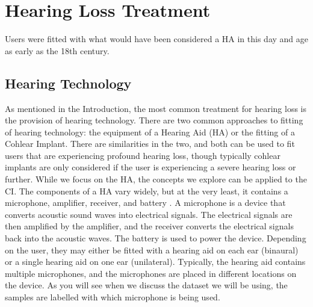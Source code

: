 \documentclass[logo,bsc,singlespacing,parskip,online]{infthesis}
\begin{document}
\section{Hearing Loss Treatment}


Users were fitted with what would have been considered a HA in this day and age as early as the 18th century.


\subsection{Hearing Technology}
As mentioned in the Introduction, the most common treatment for hearing loss 
is the provision of hearing technology. There are two common approaches 
to fitting of hearing technology: the equipment of a Hearing Aid (HA) 
or the fitting of a Cohlear Implant. There are similarities in the 
two, and both can be used to fit users that are experiencing profound hearing loss, 
though typically cohlear implants are only considered if the user is experiencing 
a severe hearing loss or further. While we 
focus on the HA, the concepts we explore can be applied to the CI.
The components of a HA vary widely, but at the very least, 
it contains a microphone, amplifier, receiver, and battery \cite{schuster-bruce_conventional_2025}.
A microphone is a device that converts acoustic sound waves into electrical signals. 
The electrical signals are then amplified by the amplifier, and the receiver converts the electrical 
signals back into the acoustic waves. The battery is used to power the device. 
Depending on the user, they may either be fitted with a hearing aid on each 
ear (binaural) or a single hearing aid on one ear (unilateral). 
Typically, the hearing aid contains multiple microphones, and the microphones 
are placed in different locations on the device. As you will see when we discuss 
the dataset we will be using, the samples are labelled with which microphone 
is being used. 
\end{document}
